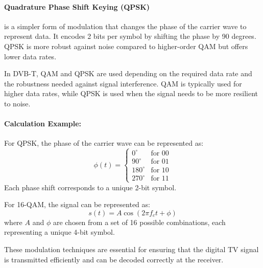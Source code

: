 \paragraph{Quadrature Phase Shift Keying (QPSK)} is a simpler form of modulation that changes the phase of the carrier wave to represent data. It encodes 2 bits per symbol by shifting the phase by 90 degrees. QPSK is more robust against noise compared to higher-order QAM but offers lower data rates.

In DVB-T, QAM and QPSK are used depending on the required data rate and the robustness needed against signal interference. QAM is typically used for higher data rates, while QPSK is used when the signal needs to be more resilient to noise.

\paragraph{Calculation Example:}
For QPSK, the phase of the carrier wave can be represented as:
\[
\phi(t) = \begin{cases}
0^\circ & \text{for } 00 \\
90^\circ & \text{for } 01 \\
180^\circ & \text{for } 10 \\
270^\circ & \text{for } 11
\end{cases}
\]
Each phase shift corresponds to a unique 2-bit symbol.

For 16-QAM, the signal can be represented as:
\[
s(t) = A \cos(2\pi f_c t + \phi)
\]
where \( A \) and \( \phi \) are chosen from a set of 16 possible combinations, each representing a unique 4-bit symbol.

These modulation techniques are essential for ensuring that the digital TV signal is transmitted efficiently and can be decoded correctly at the receiver.

